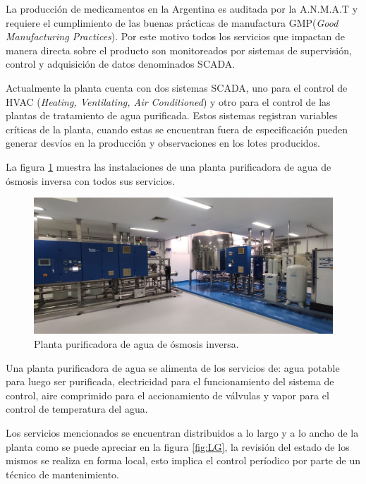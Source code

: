 La producción de medicamentos en la Argentina es auditada por la A.N.M.A.T \citep{ANMAT} y requiere el cumplimiento de las buenas prácticas de manufactura GMP(\emph{Good Manufacturing Practices}). Por este motivo todos los servicios que impactan de manera directa sobre el producto son monitoreados por sistemas de supervisión, control y adquisición de datos denominados SCADA.

Actualmente la planta cuenta con dos sistemas SCADA, uno para el control de HVAC (\emph{Heating, Ventilating, Air Conditioned}) y otro para el control de las plantas de tratamiento de agua purificada. 
Estos sistemas registran variables críticas de la planta, cuando estas se encuentran fuera de especificación pueden generar desvíos en la producción y observaciones en los lotes producidos.

La figura \ref{fig:PWNB} muestra las instalaciones de una planta purificadora de agua de ósmosis inversa con todos sus servicios.

\begin{figure}[htbp]
	\centering
	\includegraphics[width=1\textwidth]{./Figures/PWNB.png}
	\caption{Planta purificadora de agua de ósmosis inversa.}
	\label{fig:PWNB}
\end{figure}

Una planta purificadora de agua se alimenta de los servicios de: agua potable para luego ser purificada, electricidad para el funcionamiento del sistema de control, aire comprimido para el accionamiento de válvulas y vapor para el control de temperatura del agua.

Los servicios mencionados se encuentran distribuidos a lo largo y a lo ancho de la planta como se puede apreciar en la figura \ref{fig:LG}, la revisión del estado de los mismos se realiza en forma local, esto implica el control períodico por parte de un técnico de mantenimiento.


